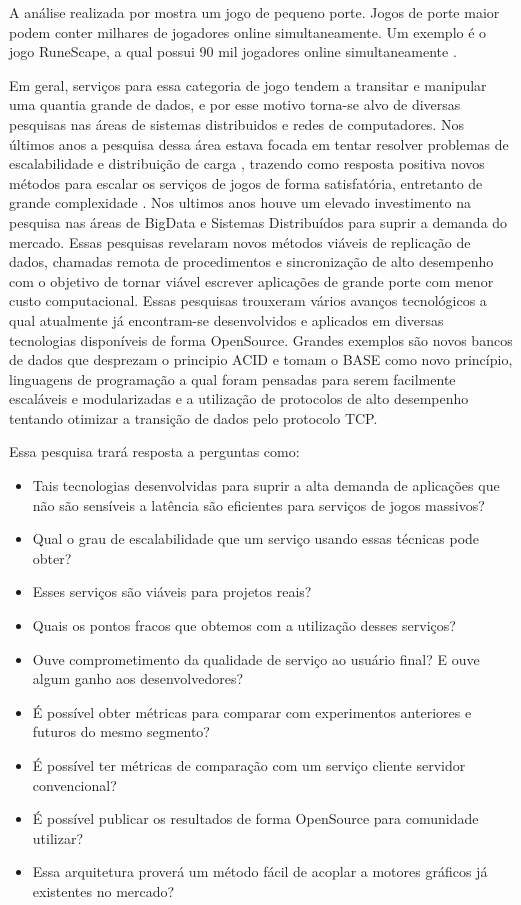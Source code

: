 A análise realizada por \cite{system_performance} mostra um jogo de pequeno porte. Jogos de porte maior podem conter milhares de jogadores online simultaneamente. Um exemplo é o jogo RuneScape, a qual possui 90 mil jogadores online simultaneamente \cite{runescape_online_users}.

Em geral, serviços para essa categoria de jogo tendem a transitar e manipular uma quantia grande de dados, e por esse motivo torna-se alvo de diversas pesquisas nas áreas de sistemas distribuidos e redes de computadores. Nos últimos anos a pesquisa dessa área estava focada em tentar resolver problemas de escalabilidade e distribuição de carga \cite{load_balance} \cite{kd_tree}, trazendo como resposta positiva novos métodos para escalar os serviços de jogos de forma satisfatória, entretanto de grande complexidade \cite{system_performance}. Nos ultimos anos houve um elevado investimento na pesquisa nas áreas de BigData e Sistemas Distribuídos para suprir a demanda do mercado. Essas pesquisas revelaram novos métodos viáveis de replicação de dados, chamadas remota de procedimentos e sincronização de alto desempenho com o objetivo de tornar viável escrever aplicações de grande porte com menor custo computacional. Essas pesquisas trouxeram vários avanços tecnológicos a qual atualmente já encontram-se desenvolvidos e aplicados em diversas tecnologias disponíveis de forma OpenSource. Grandes exemplos são novos bancos de dados que desprezam o principio ACID e tomam o BASE como novo princípio, linguagens de programação a qual foram pensadas para serem facilmente escaláveis e modularizadas e a utilização de protocolos de alto desempenho tentando otimizar a transição de dados pelo protocolo TCP.

Essa pesquisa trará resposta a perguntas como:

\begin{itemize}
  \item Tais tecnologias desenvolvidas para suprir a alta demanda de aplicações que não são sensíveis a latência são eficientes para serviços de jogos massivos?
  \item Qual o grau de escalabilidade que um serviço usando essas técnicas pode obter?
  \item Esses serviços são viáveis para projetos reais?
  \item Quais os pontos fracos que obtemos com a utilização desses serviços?
  \item Ouve comprometimento da qualidade de serviço ao usuário final? E ouve algum ganho aos desenvolvedores?
  \item É possível obter métricas para comparar com experimentos anteriores e futuros do mesmo segmento?
  \item É possível ter métricas de comparação com um serviço cliente servidor convencional?
  \item É possível publicar os resultados de forma OpenSource para comunidade utilizar?
  \item Essa arquitetura proverá um método fácil de acoplar a motores gráficos já existentes no mercado?
\end{itemize}
